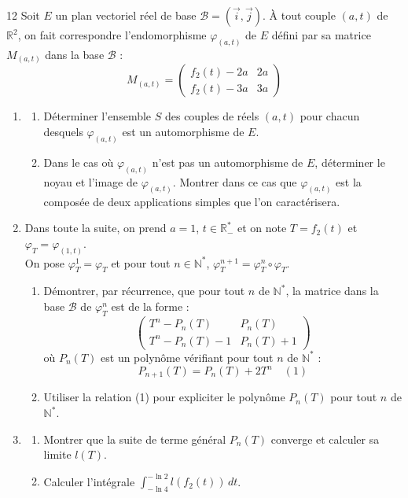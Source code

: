 \documentclass{axiobac}
\begin{document}
\begin{probleme}{12}
\horsprogramme
Soit $E$ un plan vectoriel réel de base $\mathcal{B} = (\vec{i}, \vec{j})$.
À tout couple $(a, t)$ de $\mathbb{R}^2$, on fait correspondre l'endomorphisme $\varphi_{(a,t)}$ de $E$ défini par sa matrice $M_{(a,t)}$ dans la base $\mathcal{B}$ :
\[
M_{(a,t)} = \begin{pmatrix}
    f_2(t) - 2a & 2a \\
    f_2(t) - 3a & 3a
\end{pmatrix}
\]

\begin{enumerate}
    \item 
    \begin{enumerate}
        \item Déterminer l'ensemble $S$ des couples de réels $(a, t)$ pour chacun desquels $\varphi_{(a,t)}$ est un automorphisme de $E$.
        \item Dans le cas où $\varphi_{(a,t)}$ n'est pas un automorphisme de $E$, déterminer le noyau et l'image de $\varphi_{(a,t)}$. Montrer dans ce cas que $\varphi_{(a,t)}$ est la composée de deux applications simples que l'on caractérisera.
    \end{enumerate}

    \item Dans toute la suite, on prend $a=1$, $t \in \mathbb{R}^*_-$ et on note $T = f_2(t)$ et $\varphi_T = \varphi_{(1,t)}$. \\
    On pose $\varphi_T^1 = \varphi_T$ et pour tout $n \in \mathbb{N}^*$, $\varphi_T^{n+1} = \varphi_T^n \circ \varphi_T$.
    \begin{enumerate}
        \item Démontrer, par récurrence, que pour tout $n$ de $\mathbb{N}^*$, la matrice dans la base $\mathcal{B}$ de $\varphi_T^n$ est de la forme :
        \[
        \begin{pmatrix}
            T^n - P_n(T) & P_n(T) \\
            T^n - P_n(T) - 1 & P_n(T) + 1
        \end{pmatrix}
        \]
        où $P_n(T)$ est un polynôme vérifiant pour tout $n$ de $\mathbb{N}^*$ :
        \[ P_{n+1}(T) = P_n(T) + 2T^n \quad (1) \]
        \item Utiliser la relation (1) pour expliciter le polynôme $P_n(T)$ pour tout $n$ de $\mathbb{N}^*$.
    \end{enumerate}

    \item 
    \begin{enumerate}
        \item Montrer que la suite de terme général $P_n(T)$ converge et calculer sa limite $l(T)$.
        \item Calculer l'intégrale $\int_{-\ln 4}^{-\ln 2} l(f_2(t)) \, dt$.
    \end{enumerate}
\end{enumerate}

\end{probleme}
\end{document}
